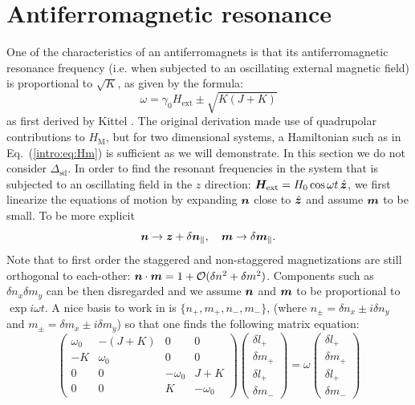 \section{Antiferromagnetic resonance}
One of the characteristics of an antiferromagnets is that its antiferromagnetic resonance frequency (i.e. when subjected to an oscillating external magnetic field) is proportional to $\sqrt{K}$, as given by the formula:
\begin{equation}
    \omega = \gamma_0 H_\text{ext} \pm \sqrt{K(J+K)}
\end{equation}
as first derived by Kittel \cite{PhysRev.82.565, PhysRev.85.329}. The original derivation made use of quadrupolar contributions to $H_\text{M}$, but for two dimensional systems, a Hamiltonian such as in Eq.~(\ref{intro:eq:Hm}) is sufficient as we will demonstrate. In this section we do not consider $\Delta_\text{sd}$. In order to find the resonant frequencies in the system that is subjected to an oscillating field in the $z$ direction: $\boldsymbol{H}_\text{ext} = H_0 \cos \omega t\,\hat{\boldsymbol{z}}$, we first linearize the equations of motion by expanding $\boldsymbol{n}$ close to $\hat{\boldsymbol{z}}$ and assume $\boldsymbol{m}$ to be small. To be more explicit
\begin{equation}
	\boldsymbol{n} \rightarrow \boldsymbol{z} + \delta \boldsymbol{n}_\parallel,\quad \boldsymbol{m} \rightarrow \delta \boldsymbol{m}_\parallel.
\end{equation}
Note that to first order the staggered and non-staggered magnetizations are still orthogonal to each-other: $\boldsymbol{n}\cdot\boldsymbol{m}=1+\mathcal{O}(\delta n^2+\delta m^2)$. Components such as $\delta n_x \delta m_y$ can be then disregarded and we assume $\boldsymbol{n}$ and $\boldsymbol{m}$ to be proportional to $\exp i \omega t$. A nice basis to work in is $\{{n}_+,{m}_+,{n}_-,{m}_- \}$, (where ${n}_\pm = \delta n_x\pm i \delta n_y$ and ${m}_\pm = \delta m_x\pm i \delta m_y$) so that one finds the following matrix equation:
\begin{equation}
    \begin{pmatrix}
    \omega_0 & -(J+K) & 0 & 0 \\
    -K & \omega_0 & 0 & 0 \\
    0 & 0 & -\omega_0 & J+K \\
    0 & 0 & K & -\omega_0
    \end{pmatrix}
    \begin{pmatrix}
    \delta l_{+}\\
    \delta m_{+}\\
    \delta l_{+}\\
    \delta m_{-}
    \end{pmatrix}
    =\omega 
    \begin{pmatrix}
    \delta l_{+}\\
    \delta m_{+}\\
    \delta l_{+}\\
    \delta m_{-}
    \end{pmatrix}
\end{equation}
